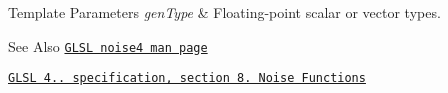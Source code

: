 \begin{DoxyTemplParams}{Template Parameters}
{\em gen\-Type} & Floating-\/point scalar or vector types.\\
\hline
\end{DoxyTemplParams}
\begin{DoxySeeAlso}{See Also}
\href{http://www.opengl.org/sdk/docs/manglsl/xhtml/noise4.xml}{\tt G\-L\-S\-L noise4 man page} 

\href{http://www.opengl.org/registry/doc/GLSLangSpec.4.20.8.pdf}{\tt G\-L\-S\-L 4.. specification, section 8. Noise Functions} 
\end{DoxySeeAlso}
